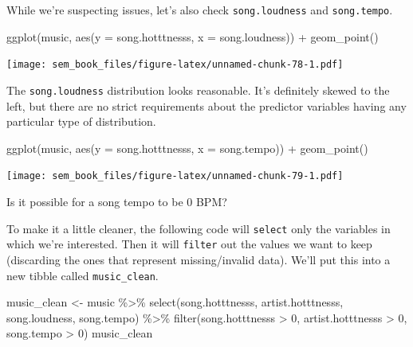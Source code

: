 \documentclass[
]{book}
\newenvironment{Shaded}{\begin{snugshade}}{\end{snugshade}}
\newcommand{\AttributeTok}[1]{\textcolor[rgb]{0.77,0.63,0.00}{#1}}
\newcommand{\DecValTok}[1]{\textcolor[rgb]{0.00,0.00,0.81}{#1}}
\newcommand{\FunctionTok}[1]{\textcolor[rgb]{0.00,0.00,0.00}{#1}}
\newcommand{\NormalTok}[1]{#1}
\newcommand{\OtherTok}[1]{\textcolor[rgb]{0.56,0.35,0.01}{#1}}
\newcommand{\SpecialCharTok}[1]{\textcolor[rgb]{0.00,0.00,0.00}{#1}}
\begin{document}
While we're suspecting issues, let's also check \texttt{song.loudness} and \texttt{song.tempo}.

\begin{Shaded}
\begin{Highlighting}[]
\FunctionTok{ggplot}\NormalTok{(music, }\FunctionTok{aes}\NormalTok{(}\AttributeTok{y =}\NormalTok{ song.hotttnesss,}
                  \AttributeTok{x =}\NormalTok{ song.loudness)) }\SpecialCharTok{+}
    \FunctionTok{geom\_point}\NormalTok{()}
\end{Highlighting}
\end{Shaded}

\texttt{[image: sem\_book\_files/figure-latex/unnamed-chunk-78-1.pdf]}

The \texttt{song.loudness} distribution looks reasonable. It's definitely skewed to the left, but there are no strict requirements about the predictor variables having any particular type of distribution.

\begin{Shaded}
\begin{Highlighting}[]
\FunctionTok{ggplot}\NormalTok{(music, }\FunctionTok{aes}\NormalTok{(}\AttributeTok{y =}\NormalTok{ song.hotttnesss,}
                  \AttributeTok{x =}\NormalTok{ song.tempo)) }\SpecialCharTok{+}
    \FunctionTok{geom\_point}\NormalTok{()}
\end{Highlighting}
\end{Shaded}

\texttt{[image: sem\_book\_files/figure-latex/unnamed-chunk-79-1.pdf]}

Is it possible for a song tempo to be 0 BPM?

To make it a little cleaner, the following code will \texttt{select} only the variables in which we're interested. Then it will \texttt{filter} out the values we want to keep (discarding the ones that represent missing/invalid data). We'll put this into a new tibble called \texttt{music\_clean}.

\begin{Shaded}
\begin{Highlighting}[]
\NormalTok{music\_clean }\OtherTok{\textless{}{-}}\NormalTok{ music }\SpecialCharTok{\%\textgreater{}\%}
    \FunctionTok{select}\NormalTok{(song.hotttnesss, artist.hotttnesss,}
\NormalTok{           song.loudness, song.tempo) }\SpecialCharTok{\%\textgreater{}\%}
    \FunctionTok{filter}\NormalTok{(song.hotttnesss }\SpecialCharTok{\textgreater{}} \DecValTok{0}\NormalTok{,}
\NormalTok{           artist.hotttnesss }\SpecialCharTok{\textgreater{}} \DecValTok{0}\NormalTok{,}
\NormalTok{           song.tempo }\SpecialCharTok{\textgreater{}} \DecValTok{0}\NormalTok{)}
\NormalTok{music\_clean}
\end{Highlighting}
\end{Shaded}
\end{document}
